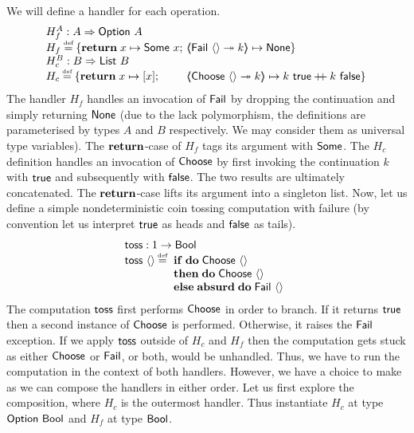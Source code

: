 \documentclass[12pt,phd,lfcs,twoside,openright,logo,leftchapter,normalheadings]{infthesis}
\theoremstyle{plain}
\theoremstyle{definition}
\begin{document}
We will define a handler for each operation.
%
\[
  \ba{@{~}l@{~}l}
     H^{A}_{f} : A \Harrow \Option~A\\
     H_{f} \defas \{ \Return\; x \mapsto \Some~x; &\OpCase{\Fail}{\Unit}{k} \mapsto \None \}\\
     H^B_{c} : B \Harrow \List~B\\
     H_{c} \defas \{ \Return\; x \mapsto [x]; &\OpCase{\Choose}{\Unit}{k} \mapsto k~\True \concat k~\False \}
   \ea
\]
%
The handler $H_f$ handles an invocation of $\mathsf{Fail}$ by dropping the
continuation and simply returning $\mathsf{None}$ (due to the lack
polymorphism, the definitions are parameterised by types $A$ and $B$
respectively. We may consider them as universal type variables). The
$\mathbf{return}$-case of $H_f$ tags its argument with $\mathsf{Some}$.
%
The $H_c$ definition handles an invocation of $\mathsf{Choose}$ by first
invoking the continuation $k$ with $\mathsf{true}$ and subsequently with
$\mathsf{false}$. The two results are ultimately concatenated. The
$\mathbf{return}$-case lifts its argument into a singleton list.
%
Now, let us define a simple nondeterministic coin tossing computation
with failure (by convention let us interpret $\mathsf{true}$ as heads and
$\mathsf{false}$ as tails).
%
\[
  \bl
    \toss : \UnitType \to \Bool\\
    \toss~\Unit \defas
                  \ba[t]{@{~}l}
                    \If\;\Do\;\Choose~\Unit\\
                    \Then\;\Do\;\Choose~\Unit\\
                    \Else\;\Absurd\;\Do\;\Fail~\Unit
                  \ea
  \el
\]
%
The computation $\mathsf{toss}$ first performs $\mathsf{Choose}$ in order to
branch. If it returns $\mathsf{true}$ then a second instance of $\mathsf{Choose}$ is
performed. Otherwise, it raises the $\mathsf{Fail}$ exception.
%
If we apply $\mathsf{toss}$ outside of $H_c$ and $H_f$ then the computation
gets stuck as either $\mathsf{Choose}$ or $\mathsf{Fail}$, or both, would be
unhandled. Thus, we have to run the computation in the context of both
handlers. However, we have a choice to make as we can compose the
handlers in either order. Let us first explore the composition, where
$H_c$ is the outermost handler. Thus instantiate $H_c$ at type
$\mathsf{Option}~\mathsf{Bool}$ and $H_f$ at type $\mathsf{Bool}$.
%
\end{document}
